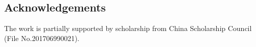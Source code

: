 \documentclass{bmcart}
\begin{document}
\begin{backmatter}
%
\section*{Acknowledgements}
The work is partially supported by scholarship  from China Scholarship Council (File No.201706990021).





\end{backmatter}
\end{document}
